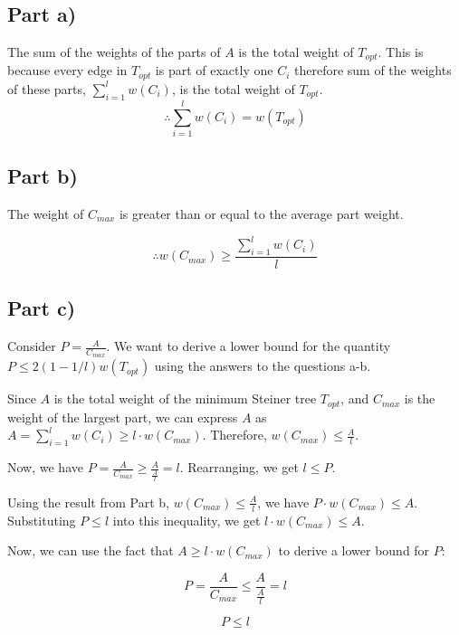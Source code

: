 \section{}

\subsection*{Part a)}

The sum of the weights of the parts of $A$ is the total weight of \(T_{opt}\). This is because every edge in \(T_{opt}\) is part of exactly one \(C_i\) therefore sum of the weights of these parts, \(\sum^{l}_{i=1} w(C_i)\), is the total weight of \(T_{opt}\).
\[\therefore \sum^{l}_{i=1} w(C_i) = w(T_{opt})\]

\subsection*{Part b)}

The weight of \(C_{max}\) is greater than or equal to the average part weight.

\[\therefore w(C_{max}) \geq \frac{ \sum^{l}_{i=1} w(C_i) }{l}\]

\subsection*{Part c)}

Consider \(P = \frac{A}{C_{max}}\). We want to derive a lower bound for the quantity \(P \leq 2(1 - 1/l) w(T_{opt})\) using the answers to the questions a-b.

Since \(A\) is the total weight of the minimum Steiner tree \(T_{opt}\), and \(C_{max}\) is the weight of the largest part, we can express \(A\) as \(A = \sum^{l}_{i=1} w(C_i) \geq l \cdot w(C_{max})\). Therefore, \(w(C_{max}) \leq \frac{A}{l}\).

Now, we have \(P = \frac{A}{C_{max}} \geq \frac{A}{\frac{A}{l}} = l\). Rearranging, we get \(l \leq P\).

Using the result from Part b, \(w(C_{max}) \leq \frac{A}{l}\), we have \(P \cdot w(C_{max}) \leq A\). Substituting \(P \leq l\) into this inequality, we get \(l \cdot w(C_{max}) \leq A\).

Now, we can use the fact that \(A \geq l \cdot w(C_{max})\) to derive a lower bound for \(P\):

\[P = \frac{A}{C_{max}} \leq \frac{A}{\frac{A}{l}} = l\]

\[P \leq l\]

